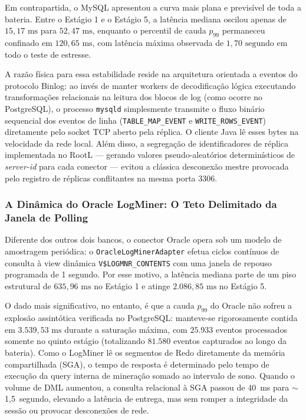 \documentclass[12pt]{article}
\begin{document}
Em contrapartida, o MySQL apresentou a curva mais plana e previsível de toda a bateria. Entre o Estágio 1 e o Estágio 5, a latência mediana oscilou apenas de $15,17\text{ ms}$ para $52,47\text{ ms}$, enquanto o percentil de cauda $p_{99}$ permaneceu confinado em $120,65\text{ ms}$, com latência máxima observada de $1,70\text{ segundo}$ em todo o teste de estresse.

A razão física para essa estabilidade reside na arquitetura orientada a eventos do protocolo Binlog: ao invés de manter workers de decodificação lógica executando transformações relacionais na leitura dos blocos de log (como ocorre no PostgreSQL), o processo \texttt{mysqld} simplesmente transmite o fluxo binário sequencial dos eventos de linha (\texttt{TABLE\_MAP\_EVENT} e \texttt{WRITE\_ROWS\_EVENT}) diretamente pelo socket TCP aberto pela réplica. O cliente Java lê esses bytes na velocidade da rede local. Além disso, a segregação de identificadores de réplica implementada no RootL — gerando valores pseudo-aleatórios determinísticos de \textit{server-id} para cada conector — evitou a clássica desconexão mestre provocada pelo registro de réplicas conflitantes na mesma porta 3306.

\subsubsection{A Dinâmica do Oracle LogMiner: O Teto Delimitado da Janela de Polling}

Diferente dos outros dois bancos, o conector Oracle opera sob um modelo de amostragem periódica: o \texttt{OracleLogMinerAdapter} efetua ciclos contínuos de consulta à view dinâmica \texttt{V\$LOGMNR\_CONTENTS} com uma janela de repouso programada de 1 segundo. Por esse motivo, a latência mediana parte de um piso estrutural de $635,96\text{ ms}$ no Estágio 1 e atinge $2.086,85\text{ ms}$ no Estágio 5.

O dado mais significativo, no entanto, é que a cauda $p_{99}$ do Oracle não sofreu a explosão assintótica verificada no PostgreSQL: manteve-se rigorosamente contida em $3.539,53\text{ ms}$ durante a saturação máxima, com $25.933$ eventos processados somente no quinto estágio (totalizando $81.580$ eventos capturados ao longo da bateria). Como o LogMiner lê os segmentos de Redo diretamente da memória compartilhada (SGA), o tempo de resposta é determinado pelo tempo de execução da query interna de mineração somado ao intervalo de sono. Quando o volume de DML aumentou, a consulta relacional à SGA passou de 40~ms para $\sim$1,5~segundo, elevando a latência de entrega, mas sem romper a integridade da sessão ou provocar desconexões de rede.
\end{document}
